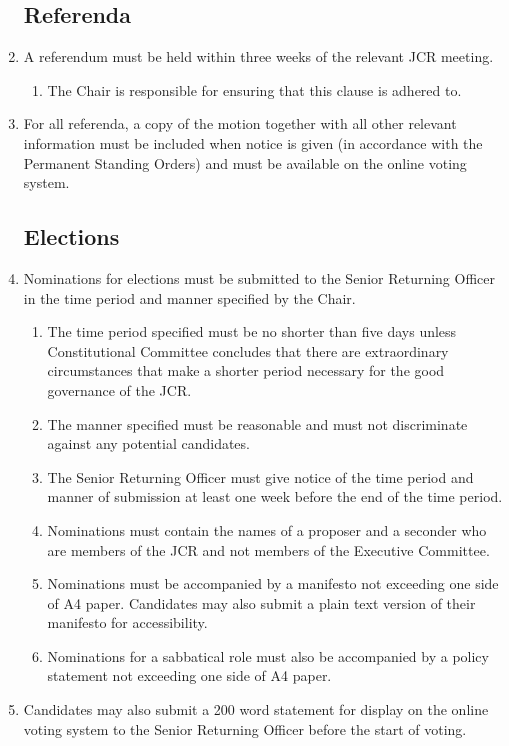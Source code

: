 \documentclass[12pt]{article}  %
\begin{document}
\begin{enumerate}
	\subsection{Referenda}
	\item A referendum must be held within three weeks of the relevant JCR meeting.
	\begin{enumerate}
		\item The Chair is responsible for ensuring that this clause is adhered to.
	\end{enumerate}
	\item For all referenda, a copy of the motion together with all other relevant information must be included when notice is given (in accordance with the Permanent Standing Orders) and must be available on the online voting system.
	\subsection{Elections}
	\item Nominations for elections must be submitted to the Senior Returning Officer in the time period and manner specified by the Chair.
	\begin{enumerate}
		\item The time period specified must be no shorter than five days unless Constitutional Committee concludes that there are extraordinary circumstances that make a shorter period necessary for the good governance of the JCR.
		\item The manner specified must be reasonable and must not discriminate against any potential candidates.
		\item The Senior Returning Officer must give notice of the time period and manner of submission at least one week before the end of the time period.
		\item Nominations must contain the names of a proposer and a seconder who are members of the JCR and not members of the Executive Committee.
		\item Nominations must be accompanied by a manifesto not exceeding one side of A4 paper. Candidates may also submit a plain text version of their manifesto for accessibility.
		\item Nominations for a sabbatical role must also be accompanied by a policy statement not exceeding one side of A4 paper.
	\end{enumerate}
	\item Candidates may also submit a 200 word statement for display on the online voting system to the Senior Returning Officer before the start of voting.

\end{enumerate}
\end{document}
